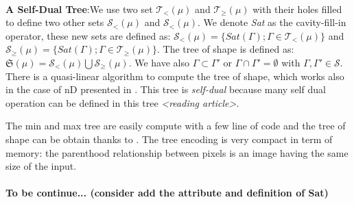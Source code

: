 \paragraph{} \textbf{A Self-Dual Tree}:We use two set $ \mathcal{T}_< (\mu)$ and $ \mathcal{T}_\geq (\mu)$ with their holes filled to define two other sets $ \mathcal{S}_< (\mu)$ and $ \mathcal{S}_< (\mu)$. We denote \textit{Sat} as the cavity-fill-in operator, these new sets are defined as: $ \mathcal{S}_< (\mu) = \lbrace Sat(\Gamma);\Gamma \in \mathcal{T}_<(\mu)\rbrace$ and $ \mathcal{S}_\geq (\mu) = \lbrace Sat(\Gamma);\Gamma \in \mathcal{T}_\geq (\mu)\rbrace$. The tree of shape is defined as: $\mathfrak{S}(\mu) = \mathcal{S}_< (\mu) \bigcup \mathcal{S}_\geq (\mu) $. We have also $\Gamma \subset \Gamma ' $ or $\Gamma \cap \Gamma '= \emptyset$ with $\Gamma , \Gamma ' \in \mathcal{S}$. There is a quasi-linear algorithm to compute the tree of shape, which works also in the case of nD presented in \cite{geraud.13.ismm}. This tree is \textit{self-dual} because many self dual operation can be defined in this tree \textit{<reading article>}.

The min and max tree are easily compute with a few line of code \cite{berger.07.icip} and the tree of shape can be obtain thanks to \cite{geraud.13.ismm}. The tree encoding is very compact in term of memory: the parenthood relationship between pixels is an image having the same size of the input. 

	
\paragraph{To be continue... (consider add the attribute and definition of Sat)}
